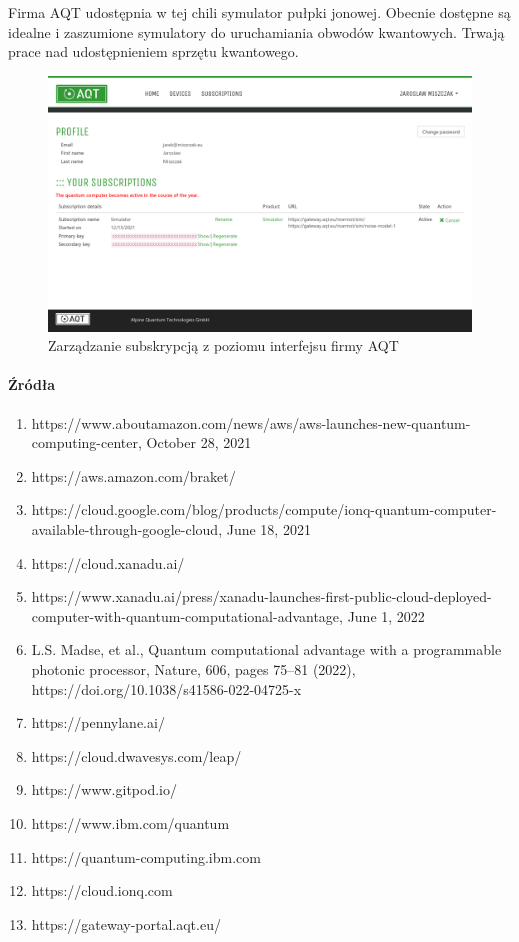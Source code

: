 \documentclass[a4paper,12pt
]{article}
\providecommand{\tightlist}{%
  \setlength{\itemsep}{0pt}\setlength{\parskip}{0pt}}
\begin{document}
Firma AQT udostępnia w tej chili symulator pułpki jonowej. Obecnie
dostępne są idealne i zaszumione symulatory do uruchamiania obwodów
kwantowych. Trwają prace nad udostępnieniem sprzętu kwantowego.

\begin{figure}
\centering
\includegraphics{aqt-subscriptions.png}
\caption{Zarządzanie subskrypcją z poziomu interfejsu firmy AQT}
\end{figure}

\hypertarget{ux17aruxf3dux142a}{%
\paragraph{Źródła}\label{ux17aruxf3dux142a}}

\begin{enumerate}
\def\labelenumi{\arabic{enumi}.}
\tightlist
\item
  https://www.aboutamazon.com/news/aws/aws-launches-new-quantum-computing-center,
  October 28, 2021
\item
  https://aws.amazon.com/braket/
\item
  https://cloud.google.com/blog/products/compute/ionq-quantum-computer-available-through-google-cloud,
  June 18, 2021
\item
  https://cloud.xanadu.ai/
\item
  https://www.xanadu.ai/press/xanadu-launches-first-public-cloud-deployed-computer-with-quantum-computational-advantage,
  June 1, 2022
\item
  L.S. Madse, et al., Quantum computational advantage with a
  programmable photonic processor, Nature, 606, pages 75--81 (2022),
  https://doi.org/10.1038/s41586-022-04725-x
\item
  https://pennylane.ai/
\item
  https://cloud.dwavesys.com/leap/
\item
  https://www.gitpod.io/
\item
  https://www.ibm.com/quantum
\item
  https://quantum-computing.ibm.com
\item
  https://cloud.ionq.com
\item
  https://gateway-portal.aqt.eu/
\end{enumerate}
\end{document}
